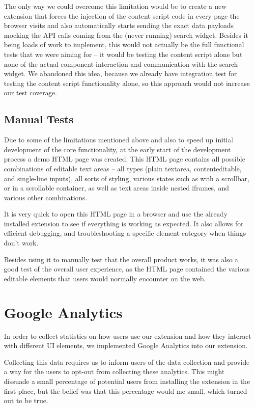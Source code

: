 \documentclass[bsc,frontabs,twoside,singlespacing,parskip,deptreport]{infthesis}
\begin{document}
The only way we could overcome this limitation would be to create a new extension that forces the injection of the content script code in every page the browser visits and also automatically starts sending the exact data payloads mocking the API calls coming from the (never running) search widget. Besides it being loads of work to implement, this would not actually be the full functional tests that we were aiming for -- it would be testing the content script alone but none of the actual component interaction and communication with the search widget. We abandoned this idea, because we already have integration test for testing the content script functionality alone, so this approach would not increase our test coverage.

\subsection{Manual Tests}
Due to some of the limitations mentioned above and also to speed up initial development of the core functionality, at the early start of the development process a demo HTML page was created. This HTML page contains all possible combinations of editable text areas -- all types (plain textarea, contenteditable, and single-line inputs), all sorts of styling, various states such as with a scrollbar, or in a scrollable container, as well as text areas inside nested iframes, and various other combinations.

It is very quick to open this HTML page in a browser and use the already installed extension to see if everything is working as expected. It also allows for efficient debugging, and troubleshooting a specific element category when things don't work.

Besides using it to manually test that the overall product works, it was also a good test of the overall user experience, as the HTML page contained the various editable elements that users would normally encounter on the web.

\section{Google Analytics}
In order to collect statistics on how users use our extension and how they interact with different UI elements, we implemented Google Analytics into our extension.

Collecting this data requires us to inform users of the data collection and provide a way for the users to opt-out from collecting these analytics. This might dissuade a small percentage of potential users from installing the extension in the first place, but the belief was that this percentage would me small, which turned out to be true.
\end{document}
